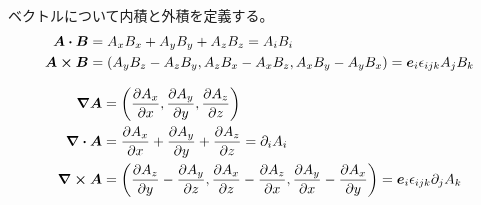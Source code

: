 \documentclass[uplatex,dvipdfmx,a4paper,11pt]{jlreq}
\newcommand{\rot}{\curl}
\theoremstyle{definition}
\begin{document}
\begin{definition}
  ベクトルについて内積と外積を定義する。
  \begin{align}
    \bm{A}\vdot\bm{B}  & = A_xB_x + A_yB_y + A_zB_z = A_iB_i                                                  \\
    \bm{A}\cross\bm{B} & = (A_yB_z - A_zB_y, A_zB_x - A_xB_z, A_xB_y - A_yB_x) = \bm{e}_i\epsilon_{ijk}A_jB_k
  \end{align}
\end{definition}
\begin{definition}
  \begin{align}
    \grad{\bm{A}} & = \qty(\pdv{A_x}{x}, \pdv{A_y}{y}, \pdv{A_z}{z})                                                                                    \\
    \div{\bm{A}}  & = \pdv{A_x}{x} + \pdv{A_y}{y} + \pdv{A_z}{z} = \partial_iA_i                                                                        \\
    \rot{\bm{A}}  & = \qty(\pdv{A_z}{y} - \pdv{A_y}{z}, \pdv{A_x}{z} - \pdv{A_z}{x}, \pdv{A_y}{x} - \pdv{A_x}{y}) = \bm{e}_i\epsilon_{ijk}\partial_jA_k
  \end{align}
\end{definition}
\end{document}
